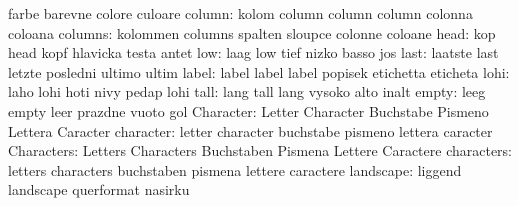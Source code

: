                            farbe                     barevne
                           colore                    culoare
                   column: kolom                     column
                           column                    column
                           colonna                   coloana %
                  columns: kolommen                  columns
                           spalten                   sloupce
                           colonne                   coloane
                     head: kop                       head
                           kopf                      hlavicka
                           testa                     antet %
                      low: laag                      low
                           tief                      nizko
                           basso                     jos
                     last: laatste                   last
                           letzte                    posledni
                           ultimo                    ultim
                    label: label                     label
                           label                     popisek
                           etichetta                 eticheta
                     lohi: laho                      lohi
                           hoti                      nivy
                           pedap                     lohi %
                     tall: lang                      tall
                           lang                      vysoko
                           alto                      inalt %
                    empty: leeg                      empty
                           leer                      prazdne
                           vuoto                     gol
                Character: Letter                    Character
                           Buchstabe                 Pismeno
                           Lettera                   Caracter
                character: letter                    character
                           buchstabe                 pismeno
                           lettera                   caracter
               Characters: Letters                   Characters
                           Buchstaben                Pismena
                           Lettere                   Caractere
               characters: letters                   characters
                           buchstaben                pismena
                           lettere                   caractere
                landscape: liggend                   landscape
                           querformat                nasirku
